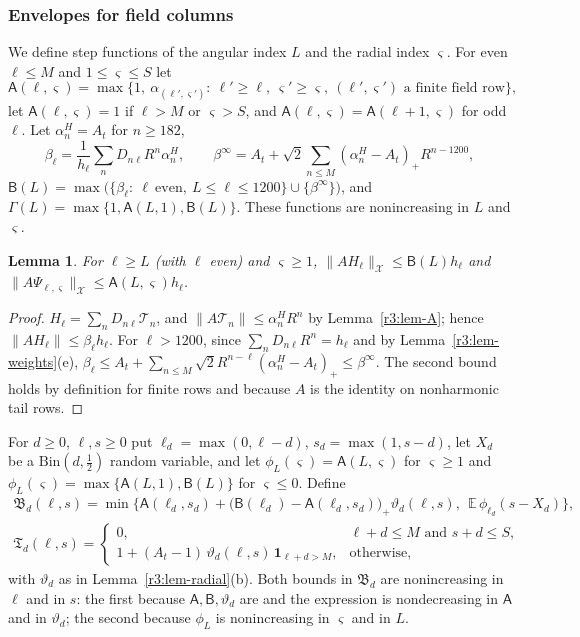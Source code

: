 \documentclass[11pt]{amsart}
\newtheorem{lemma}[theorem]{Lemma}
\theoremstyle{definition}
\theoremstyle{remark}
\numberwithin{equation}{section}
\newcommand{\one}{\mathbf{1}}
\newcommand{\nrm}[1]{\lVert #1\rVert}
\begin{document}
\subsubsection*{Envelopes for field columns}
We define step functions of the angular index $L$ and the radial index $\varsigma$. For even $\ell\leq M$ and $1\leq\varsigma\leq S$ let
\[
\mathsf A(\ell,\varsigma)=\max\{1,\ \alpha_{(\ell',\varsigma')}:\ \ell'\geq\ell,\ \varsigma'\geq\varsigma,\ (\ell',\varsigma')\text{ a finite field row}\},
\]
let $\mathsf A(\ell,\varsigma)=1$ if $\ell>M$ or $\varsigma>S$, and $\mathsf A(\ell,\varsigma)=\mathsf A(\ell+1,\varsigma)$ for odd $\ell$. Let $\alpha^H_n=A_t$ for $n\geq182$,
\[
\beta_\ell=\frac1{h_\ell}\sum_nD_{n\ell}R^n\alpha^H_n,\qquad\beta^\infty=A_t+\sqrt2\sum_{n\leq M}(\alpha^H_n-A_t)_+R^{n-1200},
\]
$\mathsf B(L)=\max\big(\{\beta_\ell:\ \ell\ \text{even},\ L\leq\ell\leq1200\}\cup\{\beta^\infty\}\big)$, and $\Gamma(L)=\max\{1,\mathsf A(L,1),\mathsf B(L)\}$. These functions are nonincreasing in $L$ and $\varsigma$.

\begin{lemma}\label{r3:lem-rows}
For $\ell\geq L$ (with $\ell$ even) and $\varsigma\geq1$, $\nrm{AH_\ell}_{\mathcal X}\leq\mathsf B(L)h_\ell$ and $\nrm{A\Psi_{\ell,\varsigma}}_{\mathcal X}\leq\mathsf A(L,\varsigma)h_\ell$.
\end{lemma}

\begin{proof}
$H_\ell=\sum_nD_{n\ell}\mathcal T_n$, and $\nrm{A\mathcal T_n}\leq\alpha^H_nR^n$ by Lemma~\ref{r3:lem-A}; hence $\nrm{AH_\ell}\leq\beta_\ell h_\ell$. For $\ell>1200$, since $\sum_nD_{n\ell}R^n=h_\ell$ and by Lemma~\ref{r3:lem-weights}(e), $\beta_\ell\leq A_t+\sum_{n\leq M}\sqrt2R^{n-\ell}(\alpha^H_n-A_t)_+\leq\beta^\infty$. The second bound holds by definition for finite rows and because $A$ is the identity on nonharmonic tail rows.
\end{proof}

For $d\geq0$, $\ell,s\geq0$ put $\ell_d=\max(0,\ell-d)$, $s_d=\max(1,s-d)$, let $X_d$ be a $\mathrm{Bin}(d,\frac12)$ random variable, and let $\phi_L(\varsigma)=\mathsf A(L,\varsigma)$ for $\varsigma\geq1$ and $\phi_L(\varsigma)=\max\{\mathsf A(L,1),\mathsf B(L)\}$ for $\varsigma\leq0$. Define
\begin{gather*}
\mathfrak B_d(\ell,s)=\min\Big\{\mathsf A(\ell_d,s_d)+\big(\mathsf B(\ell_d)-\mathsf A(\ell_d,s_d)\big)_+\vartheta_d(\ell,s),\ \ \mathbb E\,\phi_{\ell_d}(s-X_d)\Big\},\\
\mathfrak T_d(\ell,s)=\begin{cases}0,&\ell+d\leq M\text{ and }s+d\leq S,\\ 1+(A_t-1)\,\vartheta_d(\ell,s)\,\one_{\ell+d>M},&\text{otherwise},\end{cases}
\end{gather*}
with $\vartheta_d$ as in Lemma~\ref{r3:lem-radial}(b). Both bounds in $\mathfrak B_d$ are nonincreasing in $\ell$ and in $s$: the first because $\mathsf A,\mathsf B,\vartheta_d$ are and the expression is nondecreasing in $\mathsf A$ and in $\vartheta_d$; the second because $\phi_L$ is nonincreasing in $\varsigma$ and in $L$.
\end{document}
